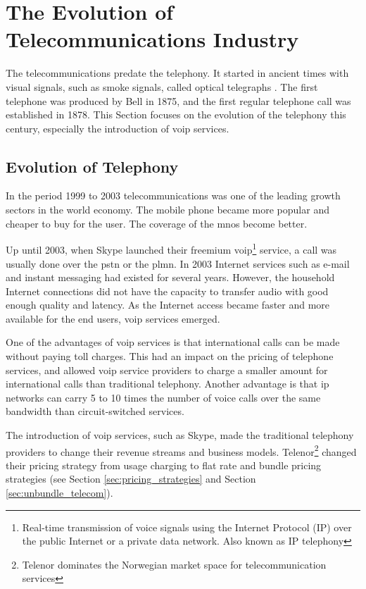 \section{The Evolution of Telecommunications Industry}
The telecommunications predate the telephony. It started in ancient times with visual signals, such as smoke signals, called optical telegraphs \cite{itu_50years}. The first telephone was produced by Bell in 1875, and the first regular telephone call was established in 1878\cite{hallock2004brief}. This Section focuses on the evolution of the telephony this century, especially the introduction of \gls{voip} services. 


\subsection{Evolution of Telephony}
In the period 1999 to 2003 telecommunications was one of the leading growth sectors in the world economy\cite{itu_50years}. The mobile phone became more popular and cheaper to buy for the user. The coverage of the \glspl{mno} become better.

Up until 2003, when Skype launched their freemium \gls{voip}\footnote{Real-time transmission of voice signals using 
the Internet Protocol (IP) over the public Internet or a private data network. Also known as IP telephony} service, a call was usually done over the \gls{pstn} or the \gls{plmn}. In 2003 Internet services such as e-mail and instant messaging had existed for several years. However, the household Internet connections did not have the capacity to transfer audio with good enough quality and latency\cite{thomasbruun}. As the Internet access became faster and more available for the end users, \gls{voip} services emerged. 

One of the advantages of \gls{voip} services is that international calls can be made without paying toll charges. This had an impact on the pricing of telephone services, and allowed \gls{voip} service providers to charge a smaller amount for international calls than traditional telephony. Another advantage is that \gls{ip} networks can carry 5 to 10 times the number of voice calls over the same bandwidth than circuit-switched services. 

The introduction of \gls{voip} services, such as Skype, made the traditional telephony providers to change their revenue streams and business models. Telenor\footnote{Telenor dominates the Norwegian market space for telecommunication services} changed their pricing strategy from usage charging to flat rate and bundle pricing strategies (see Section \ref{sec:pricing_strategies} and Section \ref{sec:unbundle_telecom}). 

